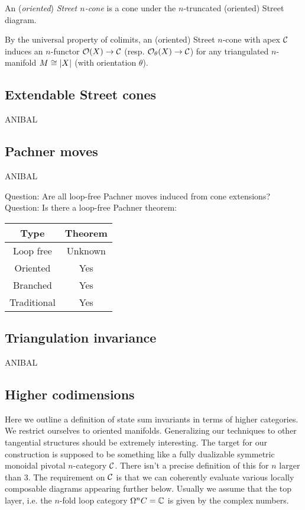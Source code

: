 An (\textit{oriented}) \textit{Street $n$-cone} is a cone under the $n$-truncated (oriented) Street diagram.

By the universal property of colimits, an (oriented) Street $n$-cone with apex $\mathcal{C}$ induces an $n$-functor $\mathcal{O}(X) \to \mathcal{C}$ (resp. $\mathcal{O}_\theta(X) \to \mathcal{C}$) for any triangulated $n$-manifold $M \cong \lvert X\rvert$ (with orientation $\theta$).

\subsection{Extendable Street cones}

ANIBAL

\subsection{Pachner moves}

ANIBAL

Question: Are all loop-free Pachner moves induced from cone extensions?
Question: Is there a loop-free Pachner theorem:
\begin{center}
	\begin{tabular}{|c|c|}
		\hline
		Type & Theorem \\ \hline
		Loop free & Unknown \\
		Oriented & Yes \\
		Branched & Yes \\
		Traditional & Yes \\ \hline
	\end{tabular}
\end{center}

\subsection{Triangulation invariance}

ANIBAL

\subsection{Higher codimensions}



\newpage

Here we outline a definition of state sum invariants in terms of higher categories.
We restrict ourselves to oriented manifolds.
Generalizing our techniques to other tangential structures should be extremely interesting.
The target for our construction is supposed to be something like a fully dualizable symmetric monoidal pivotal $n$-category $\mathcal{C}$.
There isn't a precise definition of this for $n$ larger than 3. The requirement on $\mathcal{C}$ is that we can coherently evaluate various locally composable diagrams appearing further below.
Usually we assume that the top layer, i.e.
the $n$-fold loop category $\Omega^n C = \mathbb{C} $ is given by the complex numbers.

